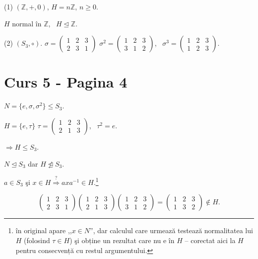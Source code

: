 \noindent (1) $(\mathbb{Z},+,0)$, $H=n\mathbb{Z}$, $n\geq 0$.

\noindent $H$ normal în $\mathbb{Z}$, \ $H\trianglelefteq\mathbb{Z}$.

\noindent (2) $(S_3,\circ)$. \quad $\sigma = \begin{pmatrix}1&2&3\\2&3&1\end{pmatrix}$ \quad $\sigma^2=\begin{pmatrix}1&2&3\\3&1&2\end{pmatrix}$, \ $\sigma^3=\begin{pmatrix}1&2&3\\1&2&3\end{pmatrix}$.



\section*{Curs 5 - Pagina 4}

\noindent $N=\{e,\sigma,\sigma^2\} \leq S_3$.

\bigskip
\noindent $H=\{e,\tau\}$ \quad $\tau = \begin{pmatrix}1&2&3\\2&1&3\end{pmatrix}$, \ $\tau^2=e$.

\noindent $\Rightarrow H\leq S_3$.

\bigskip
\noindent $N \trianglelefteq S_3$ \quad dar \quad $H\not\trianglelefteq S_3$.

\bigskip
\noindent $a\in S_3$ şi $x\in H \overset{?}{\Rightarrow} axa^{-1}\in H$.\footnote{în original apare ,,$x\in N$'', dar calculul care urmează testează normalitatea lui $H$ (folosind $\tau\in H$) şi obține un rezultat care nu e în $H$ -- corectat aici la $H$ pentru consecvență cu restul argumentului.}

\[
\begin{pmatrix}1&2&3\\2&3&1\end{pmatrix}\begin{pmatrix}1&2&3\\2&1&3\end{pmatrix}\begin{pmatrix}1&2&3\\3&1&2\end{pmatrix} = \begin{pmatrix}1&2&3\\1&3&2\end{pmatrix} \notin H.
\]

